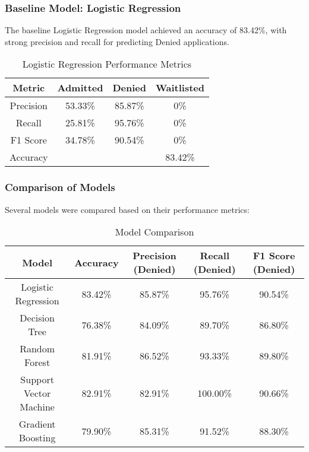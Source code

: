 \documentclass{article}
\begin{document}
\subsubsection{Baseline Model: Logistic Regression}
The baseline Logistic Regression model achieved an accuracy of 83.42\%, with strong precision and recall for predicting Denied applications.

\begin{table}[h]
\centering
\begin{tabular}{|c|c|c|c|}
\hline
Metric    & Admitted & Denied  & Waitlisted \\
\hline
Precision & 53.33\%  & 85.87\% & 0\%        \\
Recall    & 25.81\%  & 95.76\% & 0\%        \\
F1 Score  & 34.78\%  & 90.54\% & 0\%        \\
Accuracy  &          &         & 83.42\%    \\
\hline
\end{tabular}
\caption{Logistic Regression Performance Metrics}
\end{table}

\subsubsection{Comparison of Models}
Several models were compared based on their performance metrics:

\begin{table}[h]
\centering
\begin{tabular}{|c|c|c|c|c|}
\hline
Model                 & Accuracy & Precision (Denied) & Recall (Denied) & F1 Score (Denied) \\
\hline
Logistic Regression    & 83.42\%  & 85.87\%            & 95.76\%         & 90.54\%            \\
Decision Tree          & 76.38\%  & 84.09\%            & 89.70\%         & 86.80\%            \\
Random Forest          & 81.91\%  & 86.52\%            & 93.33\%         & 89.80\%            \\
Support Vector Machine & 82.91\%  & 82.91\%            & 100.00\%        & 90.66\%            \\
Gradient Boosting      & 79.90\%  & 85.31\%            & 91.52\%         & 88.30\%            \\
\hline
\end{tabular}
\caption{Model Comparison}
\end{table}
\end{document}
